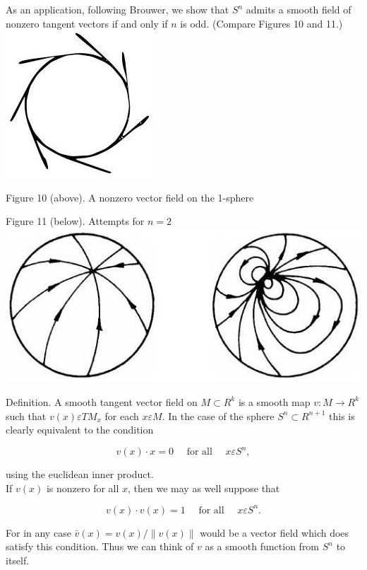 \documentclass[10pt, letterpaper]{article}
\begin{document}
As an application, following Brouwer, we show that $S^{n}$ admits a smooth field of nonzero tangent vectors if and only if $n$ is odd. (Compare Figures 10 and 11.)\\
\includegraphics[scale=0.2, center]{2025_05_28_7c9927389b272ddbc2c3g-41(1)}

Figure 10 (above). A nonzero vector field on the 1-sphere

Figure 11 (below). Attempts for $n=2$\\
\includegraphics[scale=0.2, center]{2025_05_28_7c9927389b272ddbc2c3g-41}

Definition. A smooth tangent vector field on $M \subset R^{k}$ is a smooth map $v: M \rightarrow R^{k}$ such that $v(x) \varepsilon T M_{x}$ for each $x \varepsilon M$. In the case of the sphere $S^{n} \subset R^{n+1}$ this is clearly equivalent to the condition

$$
v(x) \cdot x=0 \quad \text { for all } \quad x \varepsilon S^{n},
$$

using the euclidean inner product.\\
If $v(x)$ is nonzero for all $x$, then we may as well suppose that

$$
v(x) \cdot v(x)=1 \quad \text { for all } \quad x \varepsilon S^{n} .
$$

For in any case $\bar{v}(x)=v(x) /\|v(x)\|$ would be a vector field which does satisfy this condition. Thus we can think of $v$ as a smooth function from $S^{n}$ to itself.
\end{document}
